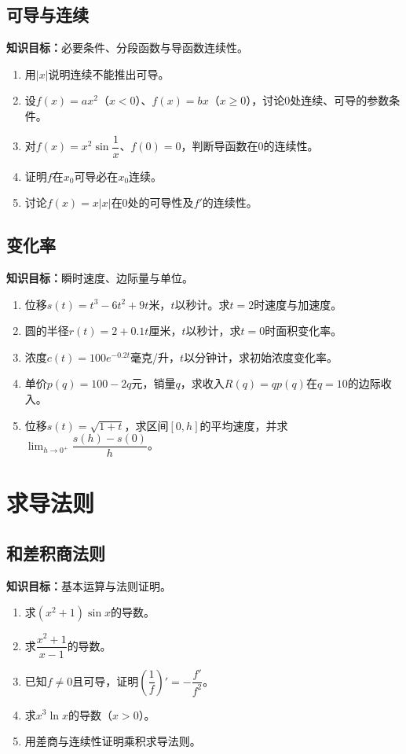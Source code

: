 \documentclass[11pt,a4paper,fontset=fandol]{ctexrep}
\newcommand{\goal}[1]{\textbf{知识目标：}#1\par}
\begin{document}
\subsection{可导与连续}
\goal{必要条件、分段函数与导函数连续性。}
\begin{enumerate}
\item 用$|x|$说明连续不能推出可导。
\item 设$f(x)=ax^2$（$x<0$）、$f(x)=bx$（$x\ge0$），讨论0处连续、可导的参数条件。
\item 对$f(x)=x^2\sin\dfrac{1}{x}$、$f(0)=0$，判断导函数在0的连续性。
\item 证明$f$在$x_0$可导必在$x_0$连续。
\item 讨论$f(x)=x|x|$在0处的可导性及$f'$的连续性。
\end{enumerate}
\subsection{变化率}
\goal{瞬时速度、边际量与单位。}
\begin{enumerate}
\item 位移$s(t)=t^3-6t^2+9t$米，$t$以秒计。求$t=2$时速度与加速度。
\item 圆的半径$r(t)=2+0.1t$厘米，$t$以秒计，求$t=0$时面积变化率。
\item 浓度$c(t)=100e^{-0.2t}$毫克/升，$t$以分钟计，求初始浓度变化率。
\item 单价$p(q)=100-2q$元，销量$q$，求收入$R(q)=qp(q)$在$q=10$的边际收入。
\item 位移$s(t)=\sqrt{1+t}$，求区间$[0,h]$的平均速度，并求$\lim_{h\to0^+}\dfrac{s(h)-s(0)}{h}$。
\end{enumerate}
\section{求导法则}
\subsection{和差积商法则}
\goal{基本运算与法则证明。}
\begin{enumerate}
\item 求$(x^2+1)\sin x$的导数。
\item 求$\dfrac{x^2+1}{x-1}$的导数。
\item 已知$f\ne0$且可导，证明$\left(\dfrac{1}{f}\right)'=-\dfrac{f'}{f^2}$。
\item 求$x^3\ln x$的导数（$x>0$）。
\item 用差商与连续性证明乘积求导法则。
\end{enumerate}
\end{document}
